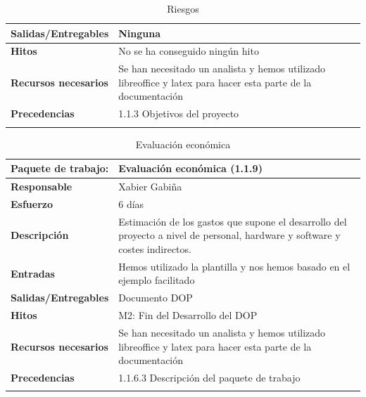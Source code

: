 \documentclass{report}
\begin{document}
\begin{center}
\begin{longtable}{|p{6cm}|p{6cm}|}
                    \hline
                    \textbf{Salidas/Entregables} & Ninguna\\
                    \hline
                    \textbf{Hitos} & No se ha conseguido ningún hito\\
                    \hline
                    \textbf{Recursos necesarios} & Se han necesitado un analista y hemos utilizado libreoffice y latex para hacer esta parte de la documentación\\
                    \hline
                    \textbf{Precedencias} & 1.1.3 Objetivos del proyecto\\
                    \hline
                    \caption{Riesgos}
                \end{longtable}
                \clearpage
                \begin{longtable}{|p{6cm}|p{6cm}|}
                    \hline
                    \textbf{Paquete de trabajo:} & Evaluación económica (1.1.9)\\
                    \hline
                    \textbf{Responsable} & Xabier Gabiña\\
                    \hline
                    \textbf{Esfuerzo} & 6 días\\
                    \hline
                    \textbf{Descripción} & Estimación de los gastos que supone el desarrollo del proyecto a nivel de personal, hardware y software y costes indirectos.\\
                    \hline
                    \textbf{Entradas} & Hemos utilizado la plantilla y nos hemos basado en el ejemplo facilitado\\
                    \hline
                    \textbf{Salidas/Entregables} & Documento DOP\\
                    \hline
                    \textbf{Hitos} & M2: Fin del Desarrollo del DOP\\
                    \hline
                    \textbf{Recursos necesarios} & Se han necesitado un analista y hemos utilizado libreoffice y latex para hacer esta parte de la documentación\\
                    \hline
                    \textbf{Precedencias} & 1.1.6.3 Descripción del paquete de trabajo\\
                    \hline
                    \caption{Evaluación económica}
                \end{longtable}
                \begin{longtable}{|p{6cm}|p{6cm}|}

\end{longtable}
\end{center}
\end{document}

